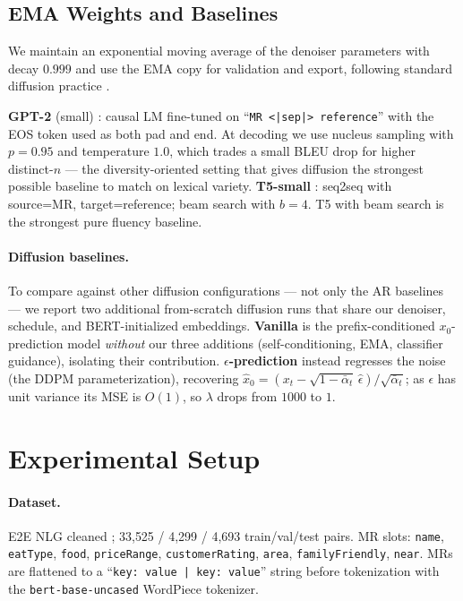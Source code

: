 \documentclass{llncs}
\begin{document}
\subsection{EMA Weights and Baselines}
We maintain an exponential moving average of the denoiser parameters with
decay $0.999$ and use the EMA copy for validation and export, following
standard diffusion practice \cite{ho2020ddpm,nichol2021improved}.

\textbf{GPT-2} (small) \cite{radford2019gpt2}: causal LM fine-tuned on
``\texttt{MR <|sep|> reference}'' with the EOS token used as both pad and
end. At decoding we use nucleus sampling with $p\!=\!0.95$ and temperature
$1.0$, which trades a small BLEU drop for higher distinct-$n$ — the
diversity-oriented setting that gives diffusion the strongest possible
baseline to match on lexical variety. \textbf{T5-small} \cite{raffel2020t5}:
seq2seq with
source=MR, target=reference; beam search with $b\!=\!4$. T5 with beam search
is the strongest pure fluency baseline.

\paragraph{Diffusion baselines.}
To compare against other diffusion configurations --- not only the AR
baselines --- we report two additional from-scratch diffusion runs that share
our denoiser, schedule, and BERT-initialized embeddings. \textbf{Vanilla} is
the prefix-conditioned $x_0$-prediction model \emph{without} our three
additions (self-conditioning, EMA, classifier guidance), isolating their
contribution. \textbf{$\epsilon$-prediction} instead regresses the noise (the
DDPM \cite{ho2020ddpm} parameterization), recovering
$\hat x_0 = (x_t - \sqrt{1-\bar\alpha_t}\,\hat\epsilon)/\sqrt{\bar\alpha_t}$;
as $\epsilon$ has unit variance its MSE is $O(1)$, so $\lambda$ drops from
$1000$ to $1$.

\section{Experimental Setup}
\label{sec:setup}

\paragraph{Dataset.} E2E NLG cleaned \cite{novikova2017e2e,dusek2019semantic};
33{,}525 / 4{,}299 / 4{,}693 train/val/test pairs. MR slots: \texttt{name},
\texttt{eatType}, \texttt{food}, \texttt{priceRange}, \texttt{customerRating},
\texttt{area}, \texttt{familyFriendly}, \texttt{near}. MRs are flattened to a
``\texttt{key: value | key: value}'' string before tokenization with the
\texttt{bert-base-uncased} WordPiece tokenizer.
\end{document}
